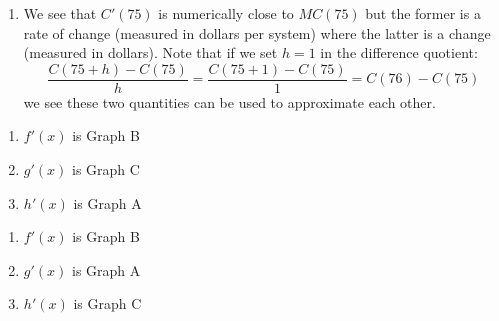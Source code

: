 \documentclass{ximera}
\begin{document}
\begin{enumerate}
\begin{enumerate}
\item  We see that $C'(75)$ is numerically close to $MC(75)$ but the former is a rate of change (measured in dollars per system) where the latter is a change (measured in dollars).  Note that if we set  $h = 1$ in the difference quotient:  \[\dfrac{C(75+h) - C(75)}{h} = \dfrac{C(75+1) - C(75)}{1} = C(76) - C(75)\] we see these two quantities can be used to approximate each other.

\end{enumerate}

\setcounter{HW}{\value{enumi}}
\end{enumerate}





\begin{multicols}{3}

\begin{enumerate}
\setcounter{enumi}{\value{HW}}

 \item $f'(x)$ is Graph B
 
 \item $g'(x)$ is Graph C
 
 
 \item $h'(x)$ is Graph A 

\setcounter{HW}{\value{enumi}}
\end{enumerate}

\end{multicols}


\begin{multicols}{3}

\begin{enumerate}
\setcounter{enumi}{\value{HW}}

 \item $f'(x)$ is Graph B
 
 \item $g'(x)$ is Graph A
 
 \item $h'(x)$ is Graph C

\setcounter{HW}{\value{enumi}}
\end{enumerate}

\end{multicols}
\end{document}
